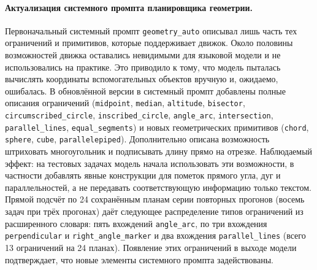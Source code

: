 \paragraph{Актуализация системного промпта планировщика геометрии.} Первоначальный системный промпт \texttt{geometry\_auto} описывал лишь часть тех ограничений и примитивов, которые поддерживает движок. Около половины возможностей движка оставались невидимыми для языковой модели и не использовались на практике. Это приводило к тому, что модель пыталась вычислять координаты вспомогательных объектов вручную и, ожидаемо, ошибалась. В обновлённой версии в системный промпт добавлены полные описания ограничений (\texttt{midpoint}, \texttt{median}, \texttt{altitude}, \texttt{bisector}, \texttt{circumscribed\_circle}, \texttt{inscribed\_circle}, \texttt{angle\_arc}, \texttt{intersection}, \texttt{parallel\_lines}, \texttt{equal\_segments}) и новых геометрических примитивов (\texttt{chord}, \texttt{sphere}, \texttt{cube}, \texttt{parallelepiped}). Дополнительно описана возможность штриховать многоугольник и подписывать длину прямо на отрезке. Наблюдаемый эффект: на тестовых задачах модель начала использовать эти возможности, в частности добавлять явные конструкции для пометок прямого угла, дуг и параллельностей, а не передавать соответствующую информацию только текстом. Прямой подсчёт по 24 сохранённым планам серии повторных прогонов (восемь задач при трёх прогонах) даёт следующее распределение типов ограничений из расширенного словаря: пять вхождений \texttt{angle\_arc}, по три вхождения \texttt{perpendicular} и \texttt{right\_angle\_marker} и два вхождения \texttt{parallel\_lines} (всего 13 ограничений на 24 планах). Появление этих ограничений в выходе модели подтверждает, что новые элементы системного промпта задействованы.

